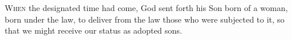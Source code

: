 \lettrine[lines=3,loversize=0.15]{W}{hen} the designated time had come, God sent forth his Son born of a woman, born under the law, to deliver from the law those who were subjected to it, so that we might receive our status as adopted sons.
